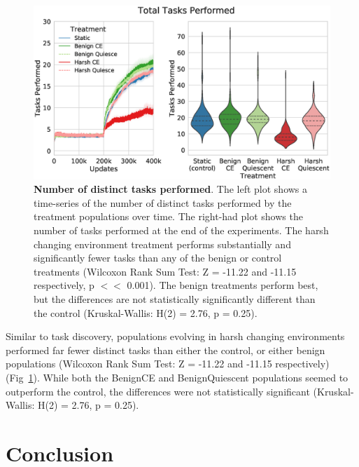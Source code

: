 \documentclass[10pt,letterpaper,final]{article}
\begin{document}
	\begin{figure}[!h]
	\includegraphics[width=0.95\columnwidth]{figures/LTE/fig17.eps}
	\caption{\textbf{Number of distinct tasks performed}. The left plot shows a time-series of the number of distinct tasks performed by the treatment populations over time. The right-had plot shows the number of tasks performed at the end of the experiments. The harsh changing environment treatment performs substantially and significantly fewer tasks than any of the benign or control treatments (Wilcoxon Rank Sum Test: Z = -11.22 and -11.15 respectively, p $<<$ 0.001). The benign treatments perform best, but the differences are not statistically significantly different than the control (Kruskal-Wallis: H(2) = 2.76, p = 0.25). %
	}
	\label{fig:lte-simple-task_performance}
	\end{figure}  


Similar to task discovery, populations evolving in harsh changing environments performed far fewer distinct tasks than either the control, or either benign populations (Wilcoxon Rank Sum Test: Z = -11.22 and -11.15 respectively) (Fig~\ref{fig:lte-simple-task_performance}). While both the BenignCE and BenignQuiescent populations seemed to outperform the control, the differences were not statistically significant (Kruskal-Wallis: H(2) = 2.76, p = 0.25).



\section*{Conclusion}
\end{document}
